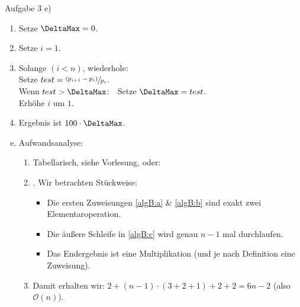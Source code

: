 \begin{frame}{Aufgabe 3 e)}
{}{\tiny
    \vspace*{-.9\baselineskip}\begin{enumerate}[(1)]
        \itemsep1.5pt
        \item\label{algB:a} Setze $\DeltaMax = 0$.
        \item\label{algB:b} Setze $i = 1$.
        \item\label{algB:c} Solange $(i < n)$, wiederhole:\smallskip\\
                \quad Setze \(test = \sfrac{(p_{i + 1} - p_i)}{p_i}\).\smallskip\\
                \quad Wenn \(test > \DeltaMax\):~~Setze \(\DeltaMax = test\).\smallskip\\
                \quad Erhöhe \(i\) um \(1\).
        \item\label{algB:d} Ergebnis ist $100 \cdot \DeltaMax$.
    \end{enumerate}
}
\begin{enumerate}[a)]
    \setcounter{enumi}{4}
    \item \pause Aufwandsanalyse: \begin{enumerate}[1.]
                \item \pause Tabellarisch, siehe Vorlesung, oder:
                \item \pause {}. Wir betrachten Stückweise: \begin{itemize}[<+(1)->]
                    \item Die ersten Zuweisungen \ref{algB:a} \& \ref{algB:b} sind  exakt zwei Elementaroperation.
                    \item Die äußere Schleife in \ref{algB:c} wird genau \(n - 1\) mal durchlaufen. 
                    \item Das Endergebnis ist eine Multiplikation (und je nach Definition eine Zuweisung).
                \end{itemize}
                \item\pause Damit erhalten wir: \(2 + (n - 1) \cdot ( 3+ 2 + 1) + 2 + 2 = 6n - 2\)\pause{} (also \(\mathcal{O}(n)\)).
            \end{enumerate}
\end{enumerate}
\end{frame}

